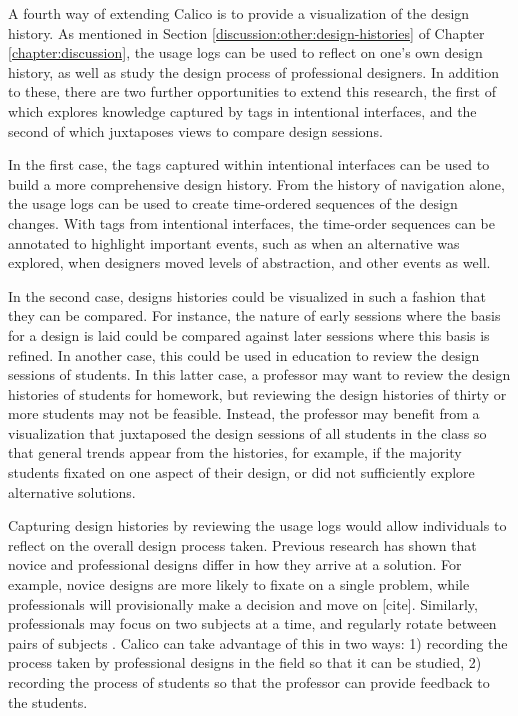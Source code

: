 \documentclass[12pt,fleqn]{ucithesis}
\begin{document}
A fourth way of extending Calico is to provide a visualization of the design history. As mentioned in Section \ref{discussion:other:design-histories} of Chapter \ref{chapter:discussion}, the usage logs can be used to reflect on one's own design history, as well as study the design process of professional designers. In addition to these, there are two further opportunities to extend this research, the first of which explores knowledge captured by tags in intentional interfaces, and the second of which juxtaposes views to compare design sessions.

In the first case, the tags captured within intentional interfaces can be used to build a more comprehensive design history. From the history of navigation alone, the usage logs can be used to create time-ordered sequences of the design changes. With tags from intentional interfaces, the time-order sequences can be annotated to highlight important events, such as when an alternative was explored, when designers moved levels of abstraction, and other events as well. 

In the second case, designs histories could be visualized in such a fashion that they can be compared. For instance, the nature of early sessions where the basis for a design is laid could be compared against later sessions where this basis is refined. In another case, this could be used in education to review the design sessions of students. In this latter case, a professor may want to review the design histories of students for homework, but reviewing the design histories of thirty or more students may not be feasible. Instead, the professor may benefit from a visualization that juxtaposed the design sessions of all students in the class so that general trends appear from the histories, for example, if the majority students fixated on one aspect of their design, or did not sufficiently explore alternative solutions.

Capturing design histories by reviewing the usage logs would allow individuals to reflect on the overall design process taken. Previous research has shown that novice and professional designs differ in how they arrive at a solution. For example, novice designs are more likely to fixate on a single problem, while professionals will provisionally make a decision and move on [cite]. Similarly, professionals may focus on two subjects at a time, and regularly rotate between pairs of subjects \cite{Baker2010590}. 
Calico can take advantage of this in two ways: 1) recording the process taken by professional designs in the field so that it can be studied, 2) recording the process of students so that the professor can provide feedback to the students.
\end{document}
